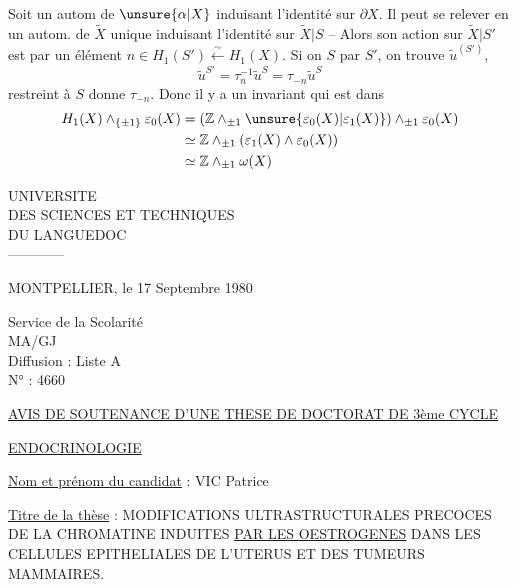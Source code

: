 Soit un autom  de $\unsure{\alpha|X}$ induisant l'identité sur $\partial X$. Il peut se relever en un autom. de $\widetilde X$ unique  induisant l'identité sur $\widetilde X|S$ -- Alors son action sur $\widetilde X|S'$ est   par un élément  $n\in H_1(S')\xleftarrow{\sim}H_1(X)$. Si on   $S$ par $S'$, on trouve $\widetilde u^{(S')}$, 
\[
\widetilde u^{S'}=\tau_n^{-1}\widetilde u^S=\tau_{-n}\widetilde u^S
\]
  restreint à $S$ donne $\tau_{-n}$. Donc il y a un invariant qui est dans
\[
\begin{aligned}
H_1(X)\wedge_{\{\pm1\}}\varepsilon_0(X)
&=(\mathbb Z\wedge_{\pm1}\unsure{\varepsilon_0(X)|\varepsilon_1(X)})\wedge_{\pm1}\varepsilon_0(X)\\
&\simeq\mathbb Z\wedge_{\pm1}(\varepsilon_1(X)\wedge\varepsilon_0(X))\\
&\simeq\mathbb Z\wedge_{\pm1}\omega(X)
\end{aligned}
\]


UNIVERSITE\\
DES SCIENCES ET TECHNIQUES\\
DU LANGUEDOC\\
------------

MONTPELLIER, le 17 Septembre 1980

Service de la Scolarité\\
MA/GJ\\
Diffusion : Liste A\\
N° : 4660

\uline{AVIS DE SOUTENANCE D'UNE THESE DE DOCTORAT DE 3ème CYCLE}

\uline{ENDOCRINOLOGIE}

\uline{Nom et prénom du candidat} : VIC Patrice

\uline{Titre de la thèse} : MODIFICATIONS ULTRASTRUCTURALES PRECOCES DE LA CHROMATINE INDUITES \uline{PAR LES OESTROGENES} DANS LES CELLULES EPITHELIALES DE L'UTERUS ET DES TUMEURS MAMMAIRES.

